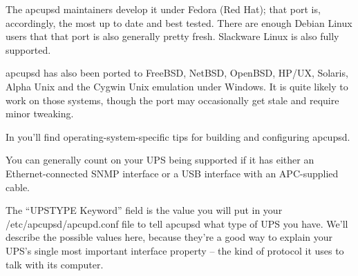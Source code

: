 The apcupsd maintainers develop it under Fedora (Red Hat); that port is,
accordingly, the most up to date and best tested.  There are enough Debian
Linux users that that port is also generally pretty fresh.  Slackware Linux is
also fully supported.  

apcupsd has also been ported to FreeBSD, NetBSD, OpenBSD, HP/UX, Solaris,
Alpha Unix and the Cygwin Unix emulation under Windows. It is quite likely to
work on those systems, though the port may occasionally get stale and require
minor tweaking.  

In 
you'll find operating-system-specific tips for building and configuring
apcupsd.  

You can generally count on your UPS being supported if it has either an
Ethernet-connected SNMP interface or a USB interface with an APC-supplied
cable.  

\label{upstypes}
The ``UPSTYPE Keyword'' field is the value you will put in your
/etc/apcupsd/apcupd.conf file to tell apcupsd what type of UPS you have. 
We'll describe the possible values here, because they're a good way to explain
your UPS's single most important interface property {--} the kind of protocol
it uses to talk with its computer.  

\label{index-UPSTYPE-10}
\label{index-Keywords_002c-USBTYPE-11}

